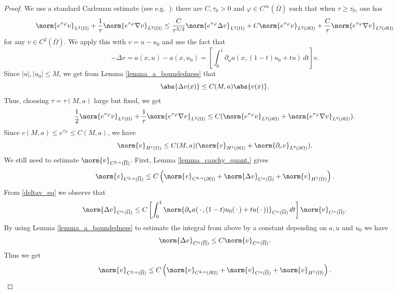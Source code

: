 \documentclass[11pt,a4paper]{amsart}
\theoremstyle{definition}
\numberwithin{equation}{section}
\newcommand{\ol}[1]{\overline{#1}}
\newcommand{\p}{\partial}
\newcommand{\Om}{\Omega}
\begin{document}
\begin{proof}
We use a standard Carleman estimate (see e.g.\ \cite[Theorem 4.1]{ChoulliPDEA2021}): there are $C, \tau_0 > 0$ and $\varphi \in C^{\infty}(\ol{\Om})$ such that when $\tau \geq \tau_0$, one has 
\[
\norm{e^{\tau \varphi} v}_{L^2(\Om)} + \frac{1}{\tau} \norm{e^{\tau \varphi} \nabla v}_{L^2(\Om)}\leq \frac{C}{\tau^{3/2}} \norm{e^{\tau \varphi} \Delta v}_{L^2(\Om)} + C \norm{e^{\tau \varphi} v}_{L^2(\p \Om)}+ \frac{C}{\tau} \norm{e^{\tau \varphi} \nabla v}_{L^2(\p \Om)}
\]
for any $v \in C^2(\ol{\Om})$. We apply this with $v = u-u_0$ and use the fact that 
\begin{equation} \label{deltav_eq}
-\Delta v = a(x,u) - a(x,u_0) = \left[ \int_0^1 \p_u a(x,(1-t)u_0 + t u) \,dt \right] v.
\end{equation}
Since $|u|, |u_0| \leq M$, we get from Lemma \ref{lemma_a_boundedness} that 
\begin{equation}\label{estimate_additional}
\abs{\Delta v(x)} \leq C(M,a) \abs{v(x)}.
\end{equation}
Thus, choosing $\tau = \tau(M,a)$ large but fixed, we get 
\[
\frac{1}{2} \norm{e^{\tau \varphi} v}_{L^2(\Om)} + \frac{1}{\tau} \norm{e^{\tau \varphi} \nabla v}_{L^2(\Om)} \leq C (\norm{e^{\tau \varphi} v}_{L^2(\p \Om)} + \norm{e^{\tau \varphi} \nabla v}_{L^2(\p \Om)}).
\]
Since $c(M,a) \leq e^{\tau \varphi} \leq C(M,a)$, we have  
\begin{equation}\label{L2_size_epsilon}
\norm{v}_{H^1(\Om)} \leq C(M,a) (\norm{v}_{H^1(\p \Om)} + \norm{\p_{\nu}v}_{L^2(\p \Om)}).
\end{equation}
We still need to estimate $\norm{v}_{C^{2,\alpha}(\ol{\Om})}$. First, Lemma \ref{lemma_cauchy_quant.} gives 
\[
\norm{v}_{C^{2,\alpha}(\ol{\Om})} \leq C\left(\norm{v}_{C^{2,\alpha}(\p\Om)} + \norm{\Delta v}_{C^{\alpha}(\ol{\Om})} + \norm{v}_{H^1(\Om)}\right).
\]
From \eqref{deltav_eq} we observe that 
\[
\norm{\Delta v}_{C^{\alpha}(\ol{\Om})} \leq C \left[ \int_0^1 \norm{\p_u a(\,\cdot\,,(1-t)u_0(\,\cdot\,) + t u(\,\cdot\,))}_{C^{\alpha}(\ol{\Om})} \,dt \right] \norm{v}_{C^{\alpha}(\ol{\Om})}.
\]
By using Lemma \ref{lemma_a_boundedness} to estimate the integral from above by a constant depending on \( a,u \) and \( u_{0} \) we have
\[
\norm{\Delta v}_{C^{\alpha}(\ol{\Om})} \leq C \norm{v}_{C^{\alpha}(\ol{\Om})}.
\]
Thus we get 
\begin{equation} \label{v_int_estimate}
    \norm{v}_{C^{2,\alpha}(\ol{\Om})} \leq C\left(\norm{v}_{C^{2,\alpha}(\p\Om)} + \norm{v}_{C^{\alpha}(\ol{\Om})} + \norm{v}_{H^1(\Om)}\right).

\end{equation}
\end{proof}
\end{document}
